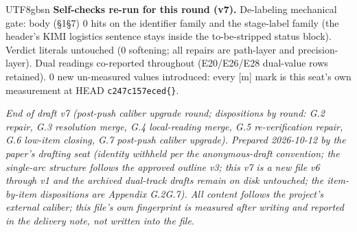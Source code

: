 \documentclass[11pt,letterpaper]{article}
\begin{document}
\begin{CJK}{UTF8}{gbsn}
\textbf{Self-checks re-run for this round (v7).} De-labeling mechanical gate: body (\S{}1\textendash{}\S{}7) 0 hits on the identifier family and the stage-label family (the header's KIMI logistics sentence stays inside the to-be-stripped status block). Verdict literals untouched (0 softening; all repairs are path-layer and precision-layer). Dual readings co-reported throughout (E20/E26/E28 dual-value rows retained). 0 new un-measured values introduced: every [m] mark is this seat's own measurement at HEAD \texttt{c247c157eced\textellipsis\{\}}.

\emph{End of draft v7 (post-push caliber upgrade round; dispositions by round: G.2 repair, G.3 resolution merge, G.4 local-reading merge, G.5 re-verification repair, G.6 low-item closing, G.7 post-push caliber upgrade). Prepared 2026-10-12 by the paper's drafting seat (identity withheld per the anonymous-draft convention; the single-arc structure follows the approved outline v3; this v7 is a new file \textemdash{} v6 through v1 and the archived dual-track drafts remain on disk untouched; the item-by-item dispositions are Appendix G.2\textendash{}G.7). All content follows the project's external caliber; this file's own fingerprint is measured after writing and reported in the delivery note, not written into the file.}


\end{CJK}
\end{document}
